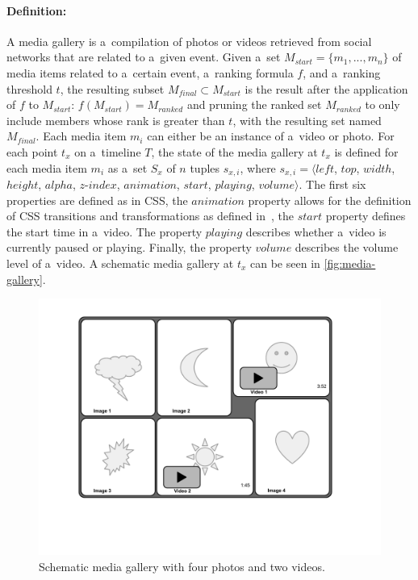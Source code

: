 \paragraph{Definition:}

A media gallery is a~compilation of photos or videos
retrieved from social networks that are related to a~given event.
Given a~set $M_{start} = \{m_1,..., m_n\}$ of media items related to a~certain event,
a~ranking formula $f$, and a~ranking threshold $t$,
the resulting subset $M_{final} \subset M_{start}$
is the result after the application of $f$ to $M_{start}$: $f(M_{start})=M_{ranked}$
and pruning the ranked set $M_{ranked}$ to only include members
whose rank is greater than $t$, with the resulting set named $M_{final}$.
Each media item $m_i$ can either be an instance of a~video or photo.
For each point $t_x$ on a~timeline $T$, the state of the media gallery
at $t_x$ is defined for each media item $m_i$
as a~set $S_x$ of $n$ tuples $s_{x,i}$, where
$s_{x,i}=\langle \mathit{left}$, $\mathit{top}$, $\mathit{width}$, $\mathit{height}$,
$\mathit{alpha}$, $\mathit{z\mbox{-}index}$, $\mathit{animation}$,
$\mathit{start}$, $\mathit{playing}$, $\mathit{volume} \rangle$.
The first six properties are defined as in CSS, the $\mathit{animation}$ property
allows for the definition of CSS transitions
and transformations as defined in~\cite{jackson2013csstransitions,fraser2012csstransforms},
the $\mathit{start}$ property defines the start time in a~video.
The property $\mathit{playing}$ describes whether a~video is currently paused or playing.
Finally, the property $\mathit{volume}$ describes the volume level
of a~video.
A schematic media gallery at $t_x$ can be seen in \autoref{fig:media-gallery}.

\begin{figure}[!ht]
  \centering
  \includegraphics[trim=20mm 40mm 20mm 10mm, clip, width=0.7\columnwidth]{media-gallery.pdf}
  \caption{Schematic media gallery with four photos and two videos.}
  \label{fig:media-gallery}
\end{figure}

